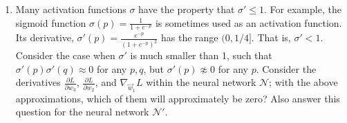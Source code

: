 \documentclass[10pt]{article}
\theoremstyle{definition}
\theoremstyle{plain}
\begin{document}
\begin{enumerate}[label=(\alph*)]
\textbf{Solution:} For $\mathcal{N}$, we have
\begin{align}
\frac{\partial L}{\partial w_2} &= \frac{\partial L}{\partial p_2} h_1 \\
&= \frac{\partial L}{\partial h_2}\sigma'(p_2) h_1 \\
&= \frac{\partial L}{\partial z} w_3 \sigma'(p_2) h_1 \\
&= (z - y) w_3 \sigma'(p_2) h_1
\end{align}
\begin{align}
\nabla_{\vec{w}_1} L &= \frac{\partial L}{\partial p_1}\vec{x} \\
&= \frac{\partial L}{\partial h_1}\sigma'(p_1)\vec{x} \\
&= \frac{\partial L}{\partial p_2} w_2 \sigma'(p_1)\vec{x} \\
&= \frac{\partial L}{\partial h_2}\sigma'(p_2) w_2 \sigma'(p_1)\vec{x} \\
&= \frac{\partial L}{\partial z} w_3 \sigma'(p_2) w_2 \sigma'(p_1)\vec{x} \\
&= (z - y) w_3 \sigma'(p_2) w_2 \sigma'(p_1)\vec{x}.
\end{align}

For $\mathcal{N}'$, we have
\begin{align}
\frac{\partial L}{\partial w_2} &= \frac{\partial L}{\partial p_2} h_1 \\
&= \frac{\partial L}{\partial h_2}\sigma'(p_2) h_1 \\
&= \frac{\partial L}{\partial z'} w_3 \sigma'(p_2) h_1 \\
&= (z' - y) w_3 \sigma'(p_2) h_1
\end{align}
\begin{align}
\nabla_{\vec{w}_1} L &= \frac{\partial L}{\partial p_1}\vec{x} \\
&= \frac{\partial L}{\partial z'}(w_3 \sigma'(p_2) w_2 \sigma'(p_1) + \sigma'(p_1))\vec{x} \\
&= (z' - y)(w_3 \sigma'(p_2) w_2 \sigma'(p_1) + \sigma'(p_1))\vec{x} \\
&= (z' - y)(w_3 \sigma'(p_2) w_2 + 1)\sigma'(p_1)\vec{x}.
\end{align}

\item Many activation functions $\sigma$ have the property that $\sigma' \leq 1$. For example, the sigmoid function $\sigma(p) = \frac{1}{1+e^{-p}}$ is sometimes used as an activation function. Its derivative, $\sigma'(p) = \frac{e^{-p}}{(1+e^{-p})^2}$ has the range $(0, 1/4]$. That is, $\sigma' < 1$. Consider the case when $\sigma'$ is much smaller than 1, such that $\sigma'(p)\sigma'(q) \approx 0$ for any $p, q$, but $\sigma'(p) \not\approx 0$ for any $p$. Consider the derivatives $\frac{\partial L}{\partial w_3}$, $\frac{\partial L}{\partial w_2}$, and $\nabla_{\vec{w}_1} L$ within the neural network $\mathcal{N}$; with the above approximations, which of them will approximately be zero? Also answer this question for the neural network $\mathcal{N}'$.


\end{enumerate}
\end{document}
